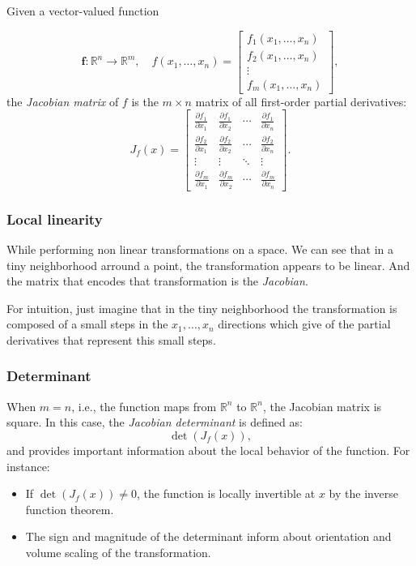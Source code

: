 Given a vector-valued function

\[
\mathbf{f} : \mathbb{R}^n \rightarrow \mathbb{R}^m, \quad f(x_1, \ldots, x_n) = 
\begin{bmatrix}
f_1(x_1, \ldots, x_n) \\
f_2(x_1, \ldots, x_n) \\
\vdots \\
f_m(x_1, \ldots, x_n)
\end{bmatrix},
\]
the \emph{Jacobian matrix} of \(f\) is the \(m \times n\) matrix of all first-order partial derivatives:
\[
J_f(x) = \begin{bmatrix}
\frac{\partial f_1}{\partial x_1} & \frac{\partial f_1}{\partial x_2} & \cdots & \frac{\partial f_1}{\partial x_n} \\
\frac{\partial f_2}{\partial x_1} & \frac{\partial f_2}{\partial x_2} & \cdots & \frac{\partial f_2}{\partial x_n} \\
\vdots & \vdots & \ddots & \vdots \\
\frac{\partial f_m}{\partial x_1} & \frac{\partial f_m}{\partial x_2} & \cdots & \frac{\partial f_m}{\partial x_n}
\end{bmatrix}.
\]

\subsubsection{Local linearity}
While performing non linear transformations on a space. We can see that in a tiny neighborhood
arround a point, the transformation appears to be linear. And the matrix that encodes that
transformation is the \emph{Jacobian}.

For intuition, just imagine that in the tiny neighborhood the transformation is composed
of a small steps in the \(x_1, \dots, x_n\) directions which give of the partial derivatives that
represent this small steps. 

\subsubsection{Determinant}
When \(m = n\), i.e., the function maps from 
\(\mathbb{R}^n\) to \(\mathbb{R}^n\), 
the Jacobian matrix is square. In this case, 
the \textit{Jacobian determinant} is defined as:
\[
\det(J_{f}(x)),
\]
and provides important information about the local behavior of the function. For instance:
\begin{itemize}[label=\(-\)]
  \item If \(\det(J_{f}(x)) \neq 0\), the function is locally invertible at \(x\) by the inverse 
  function theorem.
  \item The sign and magnitude of the determinant 
  inform about orientation and volume scaling of the transformation.
\end{itemize}

